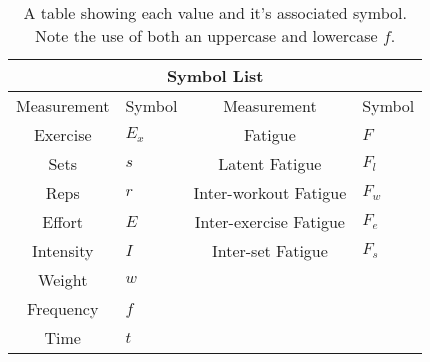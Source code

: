 \begin{table}[h]
	\centering
    \begin{tabular}{|c|l||c|l|}
	    	\hline
	    \multicolumn{4}{|c|}{Symbol List} \\
	    \hline
        Measurement & Symbol & Measurement & Symbol\\
        \hline
        Exercise & $E_x$ & Fatigue & $F$ \\
        Sets & $s$ & Latent Fatigue & $F_l$ \\
        Reps & $r$ & Inter-workout Fatigue & $F_w$ \\
        Effort & $E$ & Inter-exercise Fatigue & $F_e$ \\
        Intensity & $I$ & Inter-set Fatigue & $F_s$ \\ 
        Weight & $w$  & & \\
        Frequency & $f$ & & \\
        Time & $t$ & & \\
        \hline
    \end{tabular}
    \caption{A table showing each value and it's associated symbol. Note the use of both an uppercase and lowercase $f$.}
    \label{tab:SymbolTable}
\end{table}
